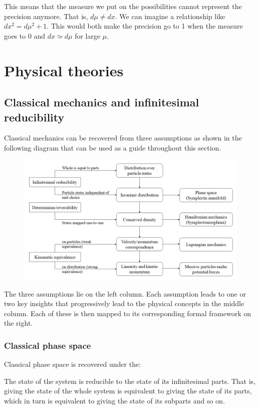 \documentclass[11pt,letterpaper,fleqn]{memoir} %
\begin{document}
This means that the measure we put on the possibilities cannot represent the precision anymore. That is, $d\mu \neq dx$. We can imagine a relationship like $dx^2 = d\mu^2 + 1$. This would both make the precision go to 1 when the measure goes to 0 and $dx \simeq d\mu$ for large $\mu$.

\chapter{Physical theories}

\section{Classical mechanics and infinitesimal reducibility}

Classical mechanics can be recovered from three assumptions as shown in the following diagram that can be used as a guide throughout this section.

\begin{figure}[h]
	\includegraphics[width=\columnwidth]{images/ClassicalDiagram.png}
\end{figure}

The three assumptions lie on the left column. Each assumption leads to one or two key insights that progressively lead to the physical concepts in the middle column. Each of these is then mapped to its corresponding formal framework on the right.

\subsection{Classical phase space}

Classical phase space is recovered under the:
\begin{assump}
	The state of the system is reducible to the state of its infinitesimal parts. That is, giving the state of the whole system is equivalent to giving the state of its parts, which in turn is equivalent to giving the state of its subparts and so on.
\end{assump}
\end{document}
